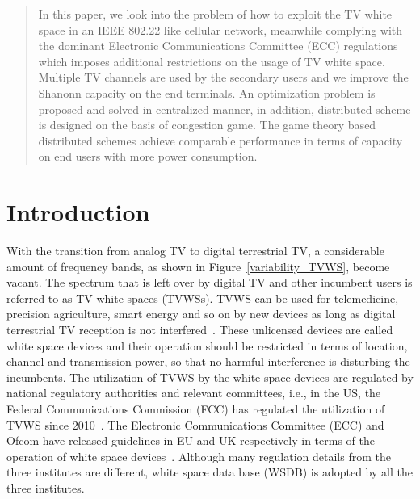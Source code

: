 \documentclass[times]{ettauth}
\newcommand{\ie}{i.e., }
\theoremstyle{mytheoremstyle}
\theoremstyle{mytheoremstyle}
\theoremstyle{mytheoremstyle}
\begin{document}




\begin{abstract}

In this paper, we look into the problem of how to exploit the TV white space in an IEEE 802.22 like cellular network, meanwhile complying with the dominant Electronic Communications Committee (ECC) regulations which imposes additional restrictions on the usage of TV white space.
Multiple TV channels are used by the secondary users and we improve the Shanonn capacity on the end terminals.
An optimization problem is proposed and solved in centralized manner, in addition, distributed scheme is designed on the basis of congestion game.
The game theory based distributed schemes achieve comparable performance in terms of capacity on end users with more power consumption.
\end{abstract}

\maketitle
\graphicspath{
{../figures/03_distributedChannelAllocation/}{../figure/03_distributedChannelAllocation/1mar2016/}{../figure/03_distributedChannelAllocation/1mar2016/radius_6000_runtimes_50/}{../../channel-power-allocation-802.22/}{../../channel-power-allocation-802.22/plots/}
}

\section{Introduction}



With the transition from analog TV to digital terrestrial TV, a considerable amount of frequency bands, as shown in Figure~\ref{variability_TVWS}, become vacant.
The spectrum that is left over by digital TV and other incumbent users is referred to as TV white spaces (TVWSs).
TVWS can be used for telemedicine, precision agriculture, smart energy and so on by new devices as long as digital terrestrial TV reception is not interfered~\cite{FCC_2010_sedond_memorandumm}. 
These unlicensed devices are called white space devices and their operation should be restricted in terms of location, channel and transmission power, so that no harmful interference is disturbing the incumbents.
The utilization of TVWS by the white space devices are regulated by national regulatory authorities and relevant committees, \ie in the US, the Federal Communications Commission (FCC) has regulated the utilization of TVWS since 2010~\cite{FCC_2010_sedond_memorandumm}. 
The Electronic Communications Committee (ECC) and Ofcom have released guidelines in EU and UK respectively in terms of the operation of white space devices~\cite{ECC236, ofcom15}.
Although many regulation details from the three institutes are different, white space data base (WSDB) is adopted by all the three institutes.
\end{document}
